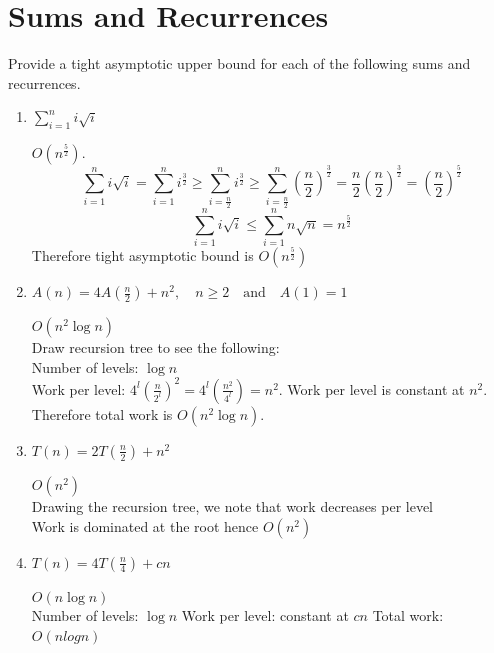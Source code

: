 \documentclass[fleqn]{article}
\begin{document}
\section{Sums and Recurrences}
Provide a tight asymptotic upper bound for each of the following sums and recurrences.
\begin{enumerate}
    \item $\sum^n_{i=1} i \sqrt{i}$
    \begin{answer}
        $O(n^{\frac{5}{2}})$. \\
        \[
            \sum^{n}_{i=1} i\sqrt{i}
            = \sum^{n}_{i=1} i^{\frac{3}{2}} 
            \geq \sum^n_{i=\frac{n}{2}} i^{\frac{3}{2}}
            \geq \sum^n_{i=\frac{n}{2}} \left(\frac{n}{2}\right)^{\frac{3}{2}}
            = \frac{n}{2} \left(\frac{n}{2}\right)^{\frac{3}{2}}
            = (\frac{n}{2})^{\frac{5}{2}}
        \]
        \[
            \sum^{n}_{i=1} i\sqrt{i}
            \leq \sum^{n}_{i=1} n\sqrt{n}
            = n^{\frac{5}{2}}
        \]
        Therefore tight asymptotic bound is $O(n^{\frac{5}{2}})$
    \end{answer}
    
    \item $A(n) = 4A\left(\frac{n}{2}\right) + n^2, \quad n \geq 2 \quad \text{and} \quad A(1) = 1$
    \begin{answer}
        $O(n^2 \log n)$ \\
        Draw recursion tree to see the following: \\
        Number of levels: $\log n$ \\
        Work per level: $
        4^l (\frac{n}{2^l})^2
        = 4^l (\frac{n^2}{4^l})
        = n^2
        $.
        Work per level is constant at $n^2$. \\
        Therefore total work is $O(n^2 \log n)$.
    \end{answer}

    \item $T(n) = 2 T\left(\frac{n}{2}\right) + n^2$
    \begin{answer}
        $O(n^2)$ \\
        Drawing the recursion tree, we note that work decreases per level\\
        Work is dominated at the root hence $O(n^2)$
    \end{answer}

    \item $T(n) = 4 T\left(\frac{n}{4}\right) + cn$
    \begin{answer}
        $O(n \log n)$ \\
        Number of levels: $\log n$
        Work per level: constant at $cn$
        Total work: $O(n log n)$
    \end{answer}


\end{enumerate}
\end{document}
